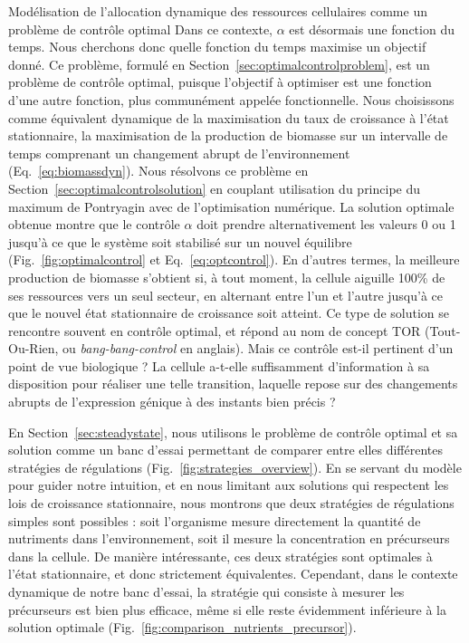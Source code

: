 \begin{chapter_summary}{Modélisation de l'allocation dynamique des ressources cellulaires comme un problème de contrôle optimal}
Dans ce contexte, $\alpha$ est désormais une fonction du temps.
Nous cherchons donc quelle fonction du temps maximise un objectif donné.
Ce problème, formulé en Section~\ref{sec:optimalcontrolproblem}, est un problème de contrôle optimal, puisque l'objectif à optimiser est une fonction d'une autre fonction, plus communément appelée fonctionnelle.
Nous choisissons comme équivalent dynamique de la maximisation du taux de croissance à l'état stationnaire, la maximisation de la production de biomasse sur un intervalle de temps comprenant un changement abrupt de l'environnement (Eq.~\ref{eq:biomassdyn}).
Nous résolvons ce problème en Section~\ref{sec:optimalcontrolsolution} en couplant utilisation du principe du maximum de Pontryagin avec de l'optimisation numérique.
La solution optimale obtenue montre que le contrôle $\alpha$ doit prendre alternativement les valeurs 0 ou 1 jusqu'à ce que le système soit stabilisé sur un nouvel équilibre (Fig.~\ref{fig:optimalcontrol} et Eq.~\ref{eq:optcontrol}).
En d'autres termes, la meilleure production de biomasse s'obtient si, à tout moment, la cellule aiguille 100\% de ses ressources vers un seul secteur, en alternant entre l'un et l'autre jusqu'à ce que le nouvel état stationnaire de croissance soit atteint.
Ce type de solution se rencontre souvent en contrôle optimal, et répond au nom de concept TOR (Tout-Ou-Rien, ou \textit{bang-bang-control} en anglais).
Mais ce contrôle est-il pertinent d'un point de vue biologique ?
La cellule a-t-elle suffisamment d'information à sa disposition pour réaliser une telle transition, laquelle repose sur des changements abrupts de l'expression génique à des instants bien précis ?

En Section~\ref{sec:steadystate}, nous utilisons le problème de contrôle optimal et sa solution comme un banc d'essai permettant de comparer entre elles différentes stratégies de régulations (Fig.~\ref{fig:strategies_overview}).
En se servant du modèle pour guider notre intuition, et en nous limitant aux solutions qui respectent les lois de croissance stationnaire, nous montrons que deux stratégies de régulations simples sont possibles : soit l'organisme mesure directement la quantité de nutriments dans l'environnement, soit il mesure la concentration en précurseurs dans la cellule.
De manière intéressante, ces deux stratégies sont optimales à l'état stationnaire, et donc strictement équivalentes.
Cependant, dans le contexte dynamique de notre banc d'essai, la stratégie qui consiste à mesurer les précurseurs est bien plus efficace, même si elle reste évidemment inférieure à la solution optimale (Fig.~\ref{fig:comparison_nutrients_precursor}).


\end{chapter_summary}
